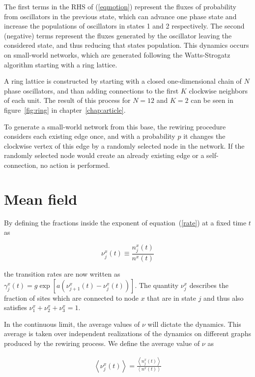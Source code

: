 \noindent The first terms in the RHS of (\ref{eqmotion}) represent the fluxes of probability from oscillators in the previous state,
which can advance one phase state and increase the populations of oscillators in states 1 and 2 respectively. The second (negative)
terms represent the fluxes generated by the oscillator leaving the considered state, and thus reducing that states population.  This
dynamics occurs on small-world networks, which are generated following the Watts-Strogatz algorithm starting with a ring lattice.

A ring lattice is constructed by starting with a closed one-dimensional chain of $N$ phase oscillators, and than adding connections to
the first $K$ clockwise neighbors of each unit. The result of this process for $N=12$ and $K=2$ can be seen in figure~\ref{fig:ring} in
chapter~\ref{chap:article}.

To generate a small-world network from this base, the rewiring procedure considers each existing edge once, and with a probability $p$
it changes the clockwise vertex of this edge by a randomly selected node in the network. If the randomly selected node would create an
already existing edge or a self-connection, no action is performed.

\section{Mean field}

By defining the fractions inside the exponent of equation~(\ref{rate}) at a fixed time $t$ as

\begin{equation}
    \nu^x_j(t) \equiv \frac{n^x_j(t)}{n^x(t)}
\end{equation}

\noindent the transition rates are now written as $\gamma^x_j(t) = g\exp\left[ a(\nu^x_{j+1}(t) - \nu^x_j(t)) \right]$. The quantity $\nu^x_j$
describes the fraction of sites which are connected to node $x$ that are in state $j$ and thus also satisfies
$\nu^x_1+\nu^x_2+\nu^x_3=1$.

In the continuous limit, the average values of $\nu$ will dictate the dynamics. This average is taken over independent realizations of
the dynamics on different graphs produced by the rewiring process. We define the average value of $\nu$ as

\begin{align}
    \left< \nu^x_j(t) \right> = \frac{\left< n^x_j(t) \right>}{\left< n^x(t) \right>}
\end{align}

